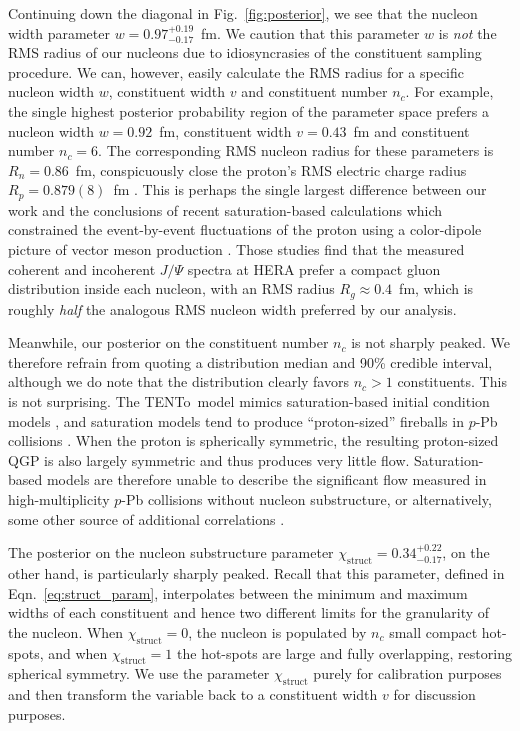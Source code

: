 \documentclass[aps,prc,reprint,amsmath,nofootinbib]{revtex4-1}
\newcommand{\trento}{T\raisebox{-0.5ex}{R}ENTo}
\newcommand{\X}{\chi_\mathrm{struct}}
\begin{document}
Continuing down the diagonal in Fig.~\ref{fig:posterior}, we see that the nucleon width parameter $w=0.97_{-0.17}^{+0.19}$~fm.
We caution that this parameter $w$ is \emph{not} the RMS radius of our nucleons due to idiosyncrasies of the constituent sampling procedure.
We can, however, easily calculate the RMS radius for a specific nucleon width $w$, constituent width $v$ and constituent number $n_c$.
For example, the single highest posterior probability region of the parameter space prefers a nucleon width $w=0.92$~fm, constituent width $v=0.43$~fm and constituent number $n_c=6$.
The corresponding RMS nucleon radius for these parameters is $R_n = 0.86$~fm, conspicuously close the proton's RMS electric charge radius $R_p = 0.879(8)$~fm \cite{Bernauer:2010wm}.
This is perhaps the single largest difference between our work and the conclusions of recent saturation-based calculations which constrained the event-by-event fluctuations of the proton using a color-dipole picture of vector meson production \cite{Mantysaari:2016ykx, Mantysaari:2016jaz}.
Those studies find that the measured coherent and incoherent $J/\Psi$ spectra at HERA prefer a compact gluon distribution inside each nucleon, with an RMS radius $R_g \approx 0.4$~fm, which is roughly \emph{half} the analogous RMS nucleon width preferred by our analysis.

Meanwhile, our posterior on the constituent number $n_c$ is not sharply peaked.
We therefore refrain from quoting a distribution median and 90\% credible interval, although we do note that the distribution clearly favors $n_c > 1$ constituents.
This is not surprising.
The \trento\ model mimics saturation-based initial condition models \cite{Bernhard:2016tnd}, and saturation models tend to produce ``proton-sized'' fireballs in $p$-Pb collisions \cite{Bzdak:2013zma}.
When the proton is spherically symmetric, the resulting proton-sized QGP is also largely symmetric and thus produces very little flow.
Saturation-based models are therefore unable to describe the significant flow measured in high-multiplicity $p$-Pb collisions without nucleon substructure, or alternatively, some other source of additional correlations \cite{Schenke:2017bog}.

The posterior on the nucleon substructure parameter $\X=0.34_{-0.17}^{+0.22}$, on the other hand, is particularly sharply peaked.
Recall that this parameter, defined in Eqn.~\eqref{eq:struct_param}, interpolates between the minimum and maximum widths of each constituent and hence
two different limits for the granularity of the nucleon.
When $\X=0$, the nucleon is populated by $n_c$ small compact hot-spots, and when $\X=1$ the hot-spots are large and fully overlapping, restoring spherical symmetry.
We use the parameter $\X$ purely for calibration purposes and then transform the variable back to a constituent width $v$ for discussion purposes.
\end{document}
